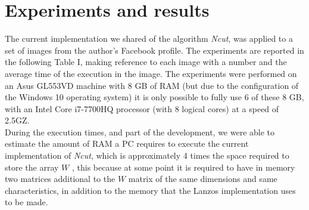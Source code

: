 \documentclass[conference]{IEEEtran}
\theoremstyle{definition}
\begin{document}
\section{Experiments and results}
The current implementation we shared of the algorithm \textit {Ncut}, was applied to a set of images from the author's Facebook profile. The experiments are reported in the following Table I, making reference to each image with a number and the average time of the execution in the image. The experiments were performed on an Asus GL553VD machine with 8 GB of RAM (but due to the configuration of the Windows 10 operating system) it is only possible to fully use 6 of these 8 GB, with an Intel Core i7-7700HQ processor (with 8 logical cores) at a speed of 2.5GZ. \\
During the execution times, and part of the development, we were able to estimate the amount of RAM a PC requires to execute the current implementation of \textit {Ncut}, which is approximately 4 times the space required to store the array $ W $ , this because at some point it is required to have in memory two matrices additional to the $ W $ matrix of the same dimensions and same characteristics, in addition to the memory that the Lanzos implementation uses to be made.
\end{document}

